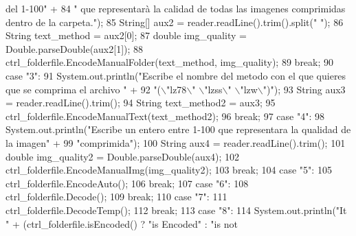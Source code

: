\begin{DoxyCode}
{       del 1-100"} +
84                             \textcolor{stringliteral}{" que representarà la calidad de todas las imagenes comprimidas dentro de la
       carpeta."});
85                     String[] aux2 = reader.readLine().trim().split(\textcolor{stringliteral}{" "});
86                     String text\_method = aux2[0];
87                     \textcolor{keywordtype}{double} img\_quality = Double.parseDouble(aux2[1]);
88                     ctrl\_folderfile.EncodeManualFolder(text\_method, img\_quality);
89                 \textcolor{keywordflow}{break};
90                 \textcolor{keywordflow}{case} \textcolor{stringliteral}{"3"}:
91                     System.out.println(\textcolor{stringliteral}{"Escribe el nombre del metodo con el que quieres que se comprima el
       archivo "} +
92                             \textcolor{stringliteral}{"(\(\backslash\)"lz78\(\backslash\)" \(\backslash\)"lzss\(\backslash\)" \(\backslash\)"lzw\(\backslash\)")"});
93                     String aux3 = reader.readLine().trim();
94                     String text\_method2 = aux3;
95                     ctrl\_folderfile.EncodeManualText(text\_method2);
96                 \textcolor{keywordflow}{break};
97                 \textcolor{keywordflow}{case} \textcolor{stringliteral}{"4"}:
98                     System.out.println(\textcolor{stringliteral}{"Escribe un entero entre 1-100 que representara la qualidad de la
       imagen"} +
99                             \textcolor{stringliteral}{"comprimida"});
100                     String aux4 = reader.readLine().trim();
101                     \textcolor{keywordtype}{double} img\_quality2 = Double.parseDouble(aux4);
102                     ctrl\_folderfile.EncodeManualImg(img\_quality2);
103                 \textcolor{keywordflow}{break};
104                 \textcolor{keywordflow}{case} \textcolor{stringliteral}{"5"}:
105                     ctrl\_folderfile.EncodeAuto();
106                 \textcolor{keywordflow}{break};
107                 \textcolor{keywordflow}{case} \textcolor{stringliteral}{"6"}:
108                     ctrl\_folderfile.Decode();
109                 \textcolor{keywordflow}{break};
110                 \textcolor{keywordflow}{case} \textcolor{stringliteral}{"7"}:
111                     ctrl\_folderfile.DecodeTemp();
112                 \textcolor{keywordflow}{break};
113                 \textcolor{keywordflow}{case} \textcolor{stringliteral}{"8"}:
114                     System.out.println(\textcolor{stringliteral}{"It "} + (ctrl\_folderfile.isEncoded() ? \textcolor{stringliteral}{"is Encoded"} : \textcolor{stringliteral}{"is not
}
\end{DoxyCode}
